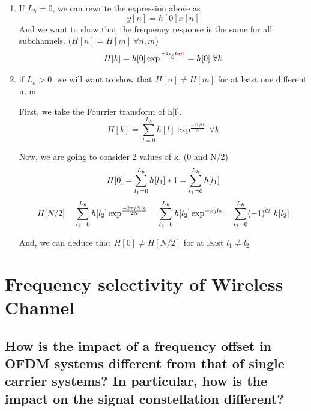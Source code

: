 \documentclass[frenchb, oneside, headings=normal]{scrartcl}
\begin{document}
\begin{enumerate}

\item If $L_h=0$, we can rewrite the expression above as
\begin{equation}
y[n]=h[0]x[n]
\end{equation}
And we want to show that the frequency response is the same for all subchannels. ($H[n]=H[m]~\forall n,m$)
\begin{equation}
H[k]=h[0]\exp^{\frac{-2\pi jk*\color{red} 0}{N}}=h[0]~\forall k
\end{equation} 

\item if $L_h>0$, we will want to show that $H[n] \neq H[m]$ for at least one different n, m.

First, we take the Fourrier transform of h[l].
\begin{equation}
H[k]=\sum_{l=0}^{L_h} h[l]\exp^{\frac{-2\pi jkl}{N}}~\forall k
\end{equation}

Now, we are going to consider 2 values of k. (0 and N/2)
\begin{equation}
H[0]=\sum_{l_1=0}^{L_h} h[l_1]*1=\sum_{l_1=0}^{L_h} h[l_1]\\
\end{equation}
\begin{equation}
H[N/2]=\sum_{l_2=0}^{L_h} h[l_2]\exp^{\frac{-2\pi jNl_2}{2N}}=\sum_{l_2=0}^{L_h} h[l_2]\exp^{-\pi jl_2}=\sum_{l_2=0}^{L_h} (-1)^{l2}~h[l_2]\\
\end{equation}

And, we can deduce that $H[0]\neq H[N/2]$ for at least $l_1\neq l_2$

\end{enumerate}

\newpage

\section{Frequency selectivity of Wireless Channel}

\subsection{How is the impact of a frequency offset in OFDM systems different from that of single carrier systems? In particular, how is the impact on the signal constellation different?}
\end{document}
